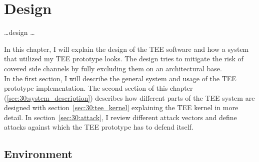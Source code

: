 \chapter{Design}
\label{sec:design}



\ldots design \ldots


In this chapter, I will explain the design of the TEE software and how a system
that utilized my TEE prototype looks. The design tries to mitigate the risk of
covered side channels by fully excluding them on an architectural base.\\

In the first section, I will describe the general system and usage of the TEE
prototype implementation. The second section of this chapter
(\ref{sec:30:system_description}) describes how different parts of the TEE system
are designed with section~\ref{sec:30:tee_kernel}  explaining the TEE kernel in
more detail. In section~\ref{sec:30:attack}, I review different attack vectors
and define attacks against which the TEE prototype has to defend itself.

\section{Environment}
\label{sec:30:environment}

